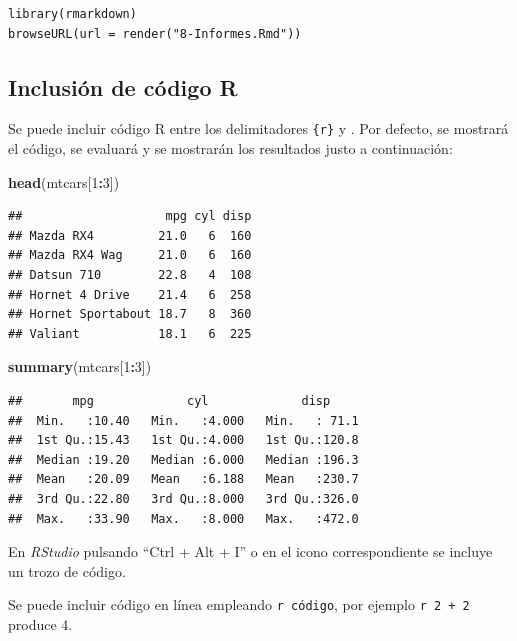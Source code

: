 \documentclass[]{book}
\newenvironment{Shaded}{\begin{snugshade}}{\end{snugshade}}
\newcommand{\KeywordTok}[1]{\textcolor[rgb]{0.13,0.29,0.53}{\textbf{#1}}}
\newcommand{\DecValTok}[1]{\textcolor[rgb]{0.00,0.00,0.81}{#1}}
\newcommand{\OperatorTok}[1]{\textcolor[rgb]{0.81,0.36,0.00}{\textbf{#1}}}
\newcommand{\NormalTok}[1]{#1}
\begin{document}
\begin{verbatim}
library(rmarkdown)
browseURL(url = render("8-Informes.Rmd"))
\end{verbatim}

\subsection{Inclusión de código R}\label{inclusion-de-codigo-r}

Se puede incluir código R entre los delimitadores
\texttt{\textasciigrave{}\textasciigrave{}\textasciigrave{}\{r\}} y
\texttt{\textasciigrave{}\textasciigrave{}\textasciigrave{}}. Por
defecto, se mostrará el código, se evaluará y se mostrarán los
resultados justo a continuación:

\begin{Shaded}
\begin{Highlighting}[]
\KeywordTok{head}\NormalTok{(mtcars[}\DecValTok{1}\OperatorTok{:}\DecValTok{3}\NormalTok{])}
\end{Highlighting}
\end{Shaded}

\begin{verbatim}
##                    mpg cyl disp
## Mazda RX4         21.0   6  160
## Mazda RX4 Wag     21.0   6  160
## Datsun 710        22.8   4  108
## Hornet 4 Drive    21.4   6  258
## Hornet Sportabout 18.7   8  360
## Valiant           18.1   6  225
\end{verbatim}

\begin{Shaded}
\begin{Highlighting}[]
\KeywordTok{summary}\NormalTok{(mtcars[}\DecValTok{1}\OperatorTok{:}\DecValTok{3}\NormalTok{])}
\end{Highlighting}
\end{Shaded}

\begin{verbatim}
##       mpg             cyl             disp      
##  Min.   :10.40   Min.   :4.000   Min.   : 71.1  
##  1st Qu.:15.43   1st Qu.:4.000   1st Qu.:120.8  
##  Median :19.20   Median :6.000   Median :196.3  
##  Mean   :20.09   Mean   :6.188   Mean   :230.7  
##  3rd Qu.:22.80   3rd Qu.:8.000   3rd Qu.:326.0  
##  Max.   :33.90   Max.   :8.000   Max.   :472.0
\end{verbatim}

En \emph{RStudio} pulsando ``Ctrl + Alt + I'' o en el icono
correspondiente se incluye un trozo de código.

Se puede incluir código en línea empleando
\texttt{\textasciigrave{}r\ código\textasciigrave{}}, por ejemplo
\texttt{\textasciigrave{}r\ 2\ +\ 2\textasciigrave{}} produce 4.
\end{document}
